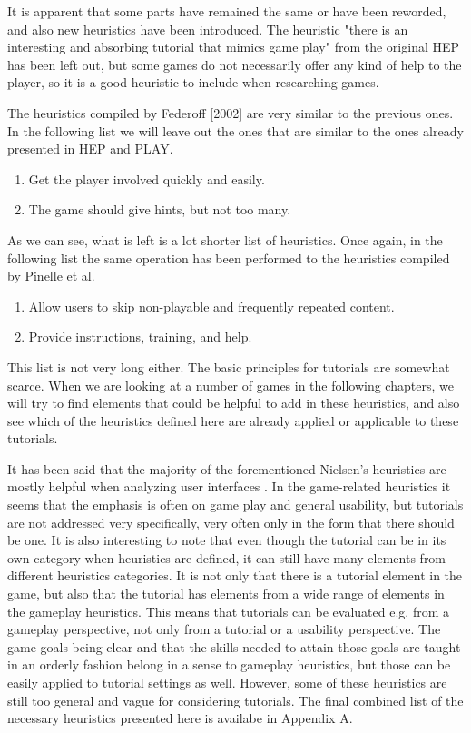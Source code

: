 It is apparent that some parts have remained the same or have been reworded, and also new heuristics have been introduced. The heuristic "there is an interesting and absorbing tutorial that mimics game play" from the original HEP has been left out, but some games do not necessarily offer any kind of help to the player, so it is a good heuristic to include when researching games. 

The heuristics compiled by Federoff [2002] are very similar to the previous ones. In the following list we will leave out the ones that are similar to the ones already presented in HEP and PLAY.

\begin{enumerate}
	\item Get the player involved quickly and easily.
	\item The game should give hints, but not too many.
\end{enumerate}

As we can see, what is left is a lot shorter list of heuristics. Once again, in the following list the same operation has been performed to the heuristics compiled by Pinelle et al. \cite{Pinelle2008}

\begin{enumerate}
	\item Allow users to skip non-playable and frequently repeated content.
	\item Provide instructions, training, and help.
\end{enumerate}

This list is not very long either. The basic principles for tutorials are somewhat scarce. When we are looking at a number of games in the following chapters, we will try to find elements that could be helpful to add in these heuristics, and also see which of the heuristics defined here are already applied or applicable to these tutorials.

It has been said that the majority of the forementioned Nielsen's heuristics are mostly helpful when analyzing user interfaces \cite{Federoff2002}. In the game-related heuristics it seems that the emphasis is often on game play and general usability, but tutorials are not addressed very specifically, very often only in the form that there should be one. It is also interesting to note that even though the tutorial can be in its own category when heuristics are defined, it can still have many elements from different heuristics categories. It is not only that there is a tutorial element in the game, but also that the tutorial has elements from a wide range of elements in the gameplay heuristics. This means that tutorials can be evaluated e.g. from a gameplay perspective, not only from a tutorial or a usability perspective. The game goals being clear and that the skills needed to attain those goals are taught in an orderly fashion belong in a sense to gameplay heuristics, but those can be easily applied to tutorial settings as well. However, some of these heuristics are still too general and vague for considering tutorials. The final combined list of the necessary heuristics presented here is availabe in Appendix A.

